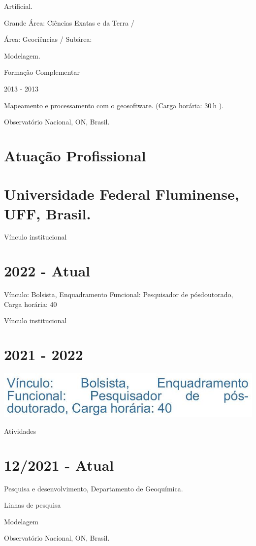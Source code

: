 \documentclass[10pt]{article}
\begin{document}
Artificial.

Grande Área: Ciências Exatas e da Terra /

Área: Geociências / Subárea:

Modelagem.

Formação Complementar

2013 - 2013

Mapeamento e processamento com o geosoftware. (Carga horária: $30 \mathrm{~h}$ ).

Observatório Nacional, ON, Brasil.

\section*{Atuação Profissional}
\section*{Universidade Federal Fluminense, UFF, Brasil.}
Vínculo institucional

\section*{2022 - Atual}
Vínculo: Bolsista, Enquadramento Funcional: Pesquisador de pósdoutorado, Carga horária: 40

Vínculo institucional

\section*{2021 - 2022}
\begin{center}
\includegraphics[max width=\textwidth]{2024_06_29_acf33ffb82555b8284bcg-03}
\end{center}

Atividades

\section*{12/2021 - Atual}
Pesquisa e desenvolvimento, Departamento de Geoquímica.

Linhas de pesquisa

Modelagem

Observatório Nacional, ON, Brasil.
\end{document}
